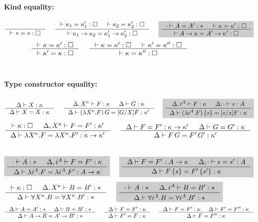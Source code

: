 \begin{figure}
\begin{framed}
\paragraph{Kind equality:} 
\[ \inference{}{|- * = *:\square}
 ~~~~
   \inference{ |- \kappa_1 = \kappa_1' : \square
             & |- \kappa_2 = \kappa_2' : \square }
             {|- \kappa_1 -> \kappa_2 = \kappa_1' -> \kappa_2' : \square}
 ~~~~ \newFi{
   \inference{\cdot |- A=A':* & |- \kappa=\kappa':\square}
             {|- A -> \kappa = A' -> \kappa' : \square} }
\]
\[ \inference{|- \kappa=\kappa':\square}
             {|- \kappa'=\kappa:\square}
 ~~~~
   \inference{ |- \kappa =\kappa' :\square
             & |- \kappa'=\kappa'':\square}
             {|- \kappa=\kappa'':\square}
\]
~\\
\paragraph{Type constructor equality:} 
\[ \inference{\Delta |- X:\kappa }{\Delta |- X=X:\kappa}
 ~~~~
   \inference{\Delta,X^\kappa |- F:\kappa & \Delta |- G:\kappa}
             {\Delta |- (\lambda X^\kappa.F)\,G = [G/X]F:\kappa'}
 ~~~~ \newFi{
   \inference{\Delta,i^A |- F:\kappa & \Delta;\cdot |- s:A}
             {\Delta |- (\lambda i^A.F)\,\{s\} = [s/x]F:\kappa} }
\]
\[ \inference{|- \kappa:\square & \Delta,X^\kappa |- F=F' : \kappa'}
             {\Delta |- \lambda X^\kappa.F=\lambda X^\kappa.F':\kappa-> \kappa'}
 ~~~~
   \inference{\Delta |- F=F':\kappa->\kappa' & \Delta |- G=G':\kappa}
             {\Delta |- F\,G = F'\,G' : \kappa'}
\]
 ~~~~
\[ \newFi{
   \inference{\cdot |- A:* & \Delta,i^A |- F=F' : \kappa}
             {\Delta |- \lambda i^A.F=\lambda i^A.F' : A -> \kappa} }
 ~~~~ \newFi{
   \inference{\Delta |- F=F':A->\kappa & \Delta;\cdot |- s=s':A}
             {\Delta |- F\,\{s\} = F'\,\{s'\} : \kappa} }
\]
\[ \inference{|- \kappa:\square & \Delta,X^\kappa |- B=B':*}
             {\Delta |- \forall X^\kappa.B=\forall X^\kappa.B':*}
 ~~~~ \newFi{
   \inference{\cdot |- A:* & \Delta,i^A |- B=B':*}
             {\Delta |- \forall i^A.B=\forall i^A.B':*} }
\]
\[ \inference{\Delta |- A=A':* & \Delta |- B=B':*}{\Delta |- A-> B=A'-> B':*}
 ~~~~
   \inference{\Delta |- F = F' : \kappa}{\Delta |- F' = F : \kappa}
 ~~~~
   \inference{\Delta |- F = F' : \kappa & \Delta |- F' = F'' : \kappa}
             {\Delta |- F = F'' : \kappa}
\]
~\\

\end{framed}
\end{figure}
